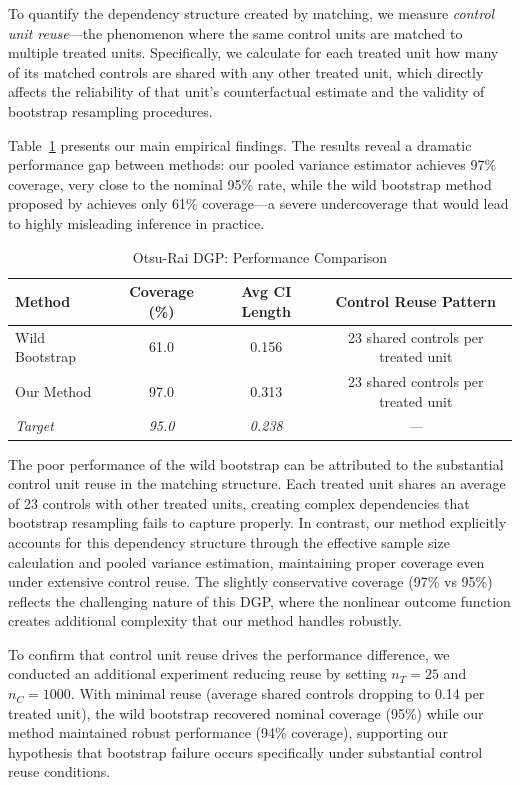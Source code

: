 \documentclass{mytemplate}
\begin{document}
To quantify the dependency structure created by matching, we measure \textit{control unit reuse}—the phenomenon where the same control units are matched to multiple treated units. Specifically, we calculate for each treated unit how many of its matched controls are shared with any other treated unit, which directly affects the reliability of that unit's counterfactual estimate and the validity of bootstrap resampling procedures. 


Table~\ref{tab:otsu-comparison} presents our main empirical findings. The results reveal a dramatic performance gap between methods: our pooled variance estimator achieves 97\% coverage, very close to the nominal 95\% rate, while the wild bootstrap method proposed by \cite{otsu2017bootstrap} achieves only 61\% coverage—a severe undercoverage that would lead to highly misleading inference in practice.

\begin{table}[ht]
\centering
\caption{Otsu-Rai DGP: Performance Comparison}
\label{tab:otsu-comparison}
\begin{tabular}{lccc}
\toprule
\textbf{Method} & \textbf{Coverage (\%)} & \textbf{Avg CI Length} & \textbf{Control Reuse Pattern} \\
\midrule
Wild Bootstrap & 61.0 & 0.156 & 23 shared controls per treated unit \\
Our Method & 97.0 & 0.313 & 23 shared controls per treated unit \\
\midrule
\textit{Target} & \textit{95.0} & \textit{0.238} & \textit{—} \\
\bottomrule
\end{tabular}
\vspace{0.1in}
\end{table}


The poor performance of the wild bootstrap can be attributed to the substantial control unit reuse in the matching structure. Each treated unit shares an average of 23 controls with other treated units, creating complex dependencies that bootstrap resampling fails to capture properly. In contrast, our method explicitly accounts for this dependency structure through the effective sample size calculation and pooled variance estimation, maintaining proper coverage even under extensive control reuse. The slightly conservative coverage (97\% vs 95\%) reflects the challenging nature of this DGP, where the nonlinear outcome function creates additional complexity that our method handles robustly.

To confirm that control unit reuse drives the performance difference, we conducted an additional experiment reducing reuse by setting $n_T = 25$ and $n_C = 1000$. With minimal reuse (average shared controls dropping to 0.14 per treated unit), the wild bootstrap recovered nominal coverage (95\%) while our method maintained robust performance (94\% coverage), supporting our hypothesis that bootstrap failure occurs specifically under substantial control reuse conditions.
\end{document}
